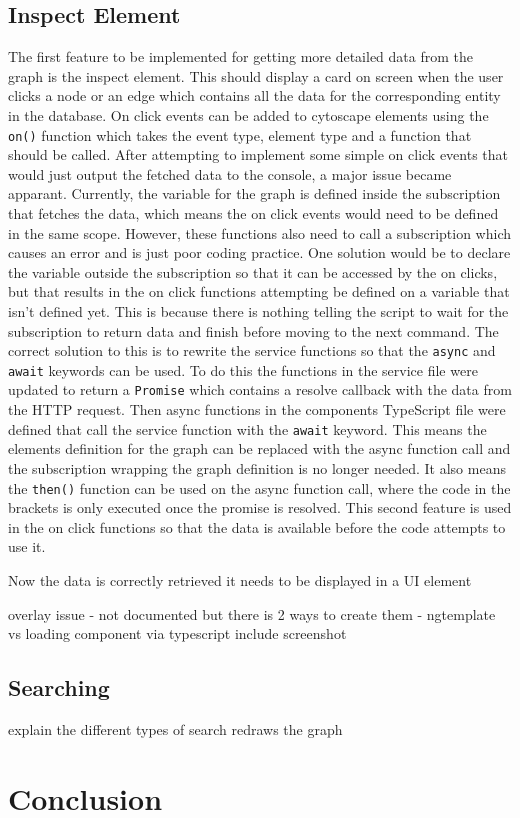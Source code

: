 \subsection{Inspect Element}
The first feature to be implemented for getting more detailed data from the graph is the inspect element. This should display 
a card on screen when the user clicks a node or an edge which contains all the data for the corresponding entity in the database. 
On click events can be added to cytoscape elements using the \verb|on()| function which takes the event type, element type and a function that should be called. 
After attempting to implement some simple on click events that would just output the fetched data to the console, a major issue became apparant.
Currently, the variable for the graph is defined inside the subscription that fetches the data, which means the on click events would need to be 
defined in the same scope. However, these functions also need to call a subscription which causes an error and is just poor coding practice. One solution 
would be to declare the variable outside the subscription so that it can be accessed by the on clicks, but that results in the on click 
functions attempting be defined on a variable that isn't defined yet. This is because there is nothing telling the script to wait for the 
subscription to return data and finish before moving to the next command. The correct solution to this is to rewrite the service functions so that 
the \verb|async| and \verb|await| keywords can be used. To do this the functions in the service file were updated to return a \verb|Promise| which contains a resolve 
callback with the data from the HTTP request. Then async functions in the components TypeScript file were defined that call the service function 
with the \verb|await| keyword. This means the elements definition for the graph can be replaced with the async function call 
and the subscription wrapping the graph definition is no longer needed. It also means the \verb|then()| function can be used on the async function call, 
where the code in the brackets is only executed once the promise is resolved. This second feature is used in the on click functions so that the data is available 
before the code attempts to use it.

Now the data is correctly retrieved it needs to be displayed in a UI element

overlay issue
- not documented but there is 2 ways to create them
- ngtemplate vs loading component via typescript
include screenshot
\subsection{Searching}
explain the different types of search
redraws the graph
\section{Conclusion}